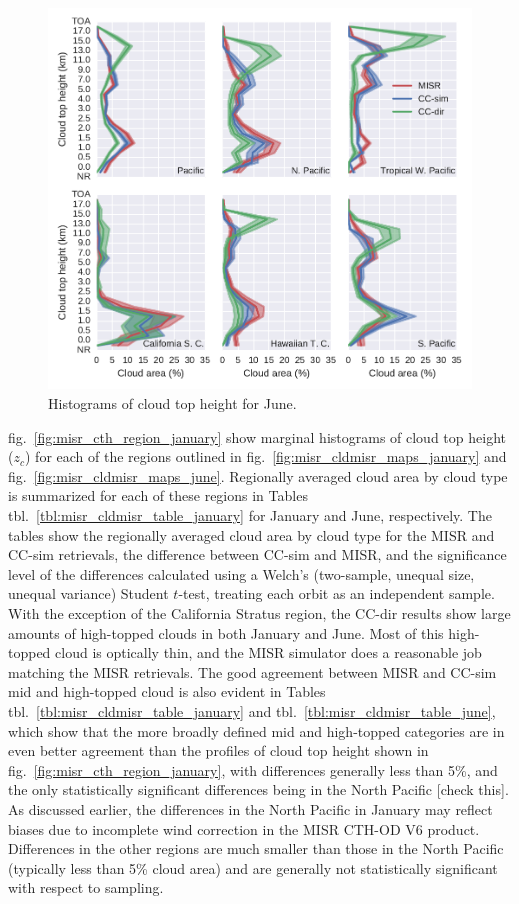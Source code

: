 \begin{figure}[htbp]
\centering
\includegraphics{graphics/misr_cth_2008-06.pdf}
\caption{\label{fig:misr_cth_region_june}Histograms of cloud top height
for June.}\label{fig:misrux5fcthux5fregionux5fjune}
\end{figure}

fig.~\ref{fig:misr_cth_region_january} show marginal histograms of cloud
top height (\(z_c\)) for each of the regions outlined in
fig.~\ref{fig:misr_cldmisr_maps_january} and
fig.~\ref{fig:misr_cldmisr_maps_june}. Regionally averaged cloud area by
cloud type is summarized for each of these regions in Tables
tbl.~\ref{tbl:misr_cldmisr_table_january} for January and June,
respectively. The tables show the regionally averaged cloud area by
cloud type for the MISR and CC-sim retrievals, the difference between
CC-sim and MISR, and the significance level of the differences
calculated using a Welch's (two-sample, unequal size, unequal variance)
Student \(t\)-test, treating each orbit as an independent sample. With
the exception of the California Stratus region, the CC-dir results show
large amounts of high-topped clouds in both January and June. Most of
this high-topped cloud is optically thin, and the MISR simulator does a
reasonable job matching the MISR retrievals. The good agreement between
MISR and CC-sim mid and high-topped cloud is also evident in Tables
tbl.~\ref{tbl:misr_cldmisr_table_january} and
tbl.~\ref{tbl:misr_cldmisr_table_june}, which show that the more broadly
defined mid and high-topped categories are in even better agreement than
the profiles of cloud top height shown in
fig.~\ref{fig:misr_cth_region_january}, with differences generally less
than 5\%, and the only statistically significant differences being in
the North Pacific {[}check this{]}. As discussed earlier, the
differences in the North Pacific in January may reflect biases due to
incomplete wind correction in the MISR CTH-OD V6 product. Differences in
the other regions are much smaller than those in the North Pacific
(typically less than 5\% cloud area) and are generally not statistically
significant with respect to sampling.

